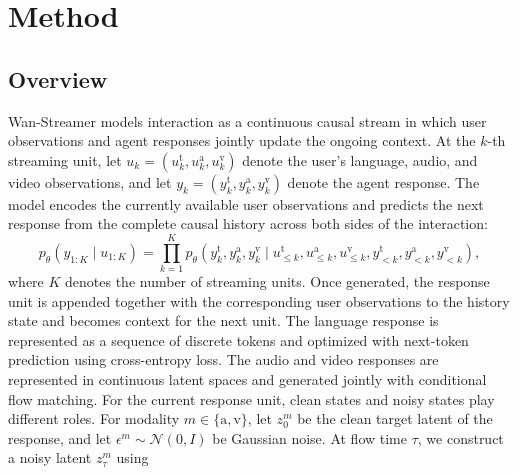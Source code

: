 \documentclass{llmxive}
\begin{document}
\FloatBarrier









\section{Method}
\label{sec:method}

\subsection{Overview}
Wan-Streamer models interaction as a continuous causal stream in which user observations and agent responses jointly update the ongoing context. At the $k$-th streaming unit, let
$u_k=(u_k^{\mathrm{t}},u_k^{\mathrm{a}},u_k^{\mathrm{v}})$ denote the user's language, audio, and video observations, and let
$y_k=(y_k^{\mathrm{t}},y_k^{\mathrm{a}},y_k^{\mathrm{v}})$ denote the agent response. The model encodes the currently available user observations and predicts the next response from the complete causal history across both sides of the interaction:
\begin{equation}
\label{eq:ar-factorization}
    p_\theta(y_{1:K}\mid u_{1:K})=\prod_{k=1}^{K} p_\theta\!\left( y_k^{\mathrm{t}},y_k^{\mathrm{a}},y_k^{\mathrm{v}} \mid u_{\le k}^{\mathrm{t}},u_{\le k}^{\mathrm{a}},u_{\le k}^{\mathrm{v}}, y_{<k}^{\mathrm{t}},y_{<k}^{\mathrm{a}},y_{<k}^{\mathrm{v}} \right),
\end{equation}
where $K$ denotes the number of streaming units. Once generated, the response unit is appended together with the corresponding user observations to the history state and becomes context for the next unit. The language response is represented as a sequence of discrete tokens and optimized with next-token prediction using cross-entropy loss.
The audio and video responses are represented in continuous latent spaces and generated jointly with conditional flow matching. For the current response unit, clean states and noisy states play different roles. For modality $m\in\{\mathrm{a},\mathrm{v}\}$, let $z_0^m$ be the clean target latent of the response, and let $\epsilon^m\sim\mathcal N(0,I)$ be Gaussian noise. At flow time $\tau$, we construct a noisy latent $z_\tau^m$ using
\end{document}

